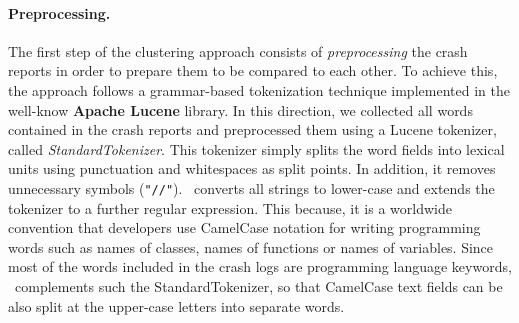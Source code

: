 \paragraph{Preprocessing.}
The first step of the clustering approach consists of \textit{preprocessing} the crash reports in order to prepare them to be compared to each other. 
To achieve this, the approach follows a grammar-based tokenization technique implemented in the well-know \textbf{Apache Lucene} \cite{lucene} library.  
In this direction, we collected all words contained in the crash reports and preprocessed them using a Lucene tokenizer, called \textit{StandardTokenizer}. 
This tokenizer simply splits the word fields into lexical units using punctuation and whitespaces as split points. In addition, it removes unnecessary symbols (\eg \texttt{"//"}).
\toolname\ converts all strings to lower-case and extends the tokenizer to a further regular expression. 
This because, it is a worldwide convention that developers use CamelCase notation for writing programming words such as names of classes, names of functions or names of variables.
Since most of the words included in the crash logs are programming language keywords, \toolname\ complements such the StandardTokenizer, so that CamelCase text fields can be also split at the upper-case letters into separate words. 

